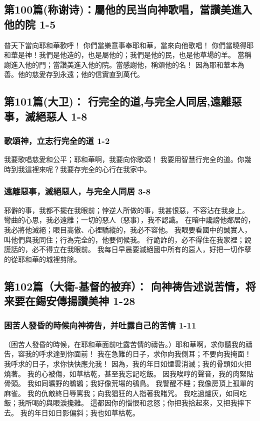 \subsection{第100篇(称谢诗)：屬他的民当向神歌唱，當讚美進入他的院 1-5}
普天下當向耶和華歡呼！
你們當樂意事奉耶和華，當來向他歌唱！
你們當曉得耶和華是神！我們是他造的，也是屬他的；我們是他的民，也是他草場的羊。
當稱謝進入他的門；當讚美進入他的院。當感謝他，稱頌他的名！
因為耶和華本為善。他的慈愛存到永遠；他的信實直到萬代。


\subsection{第101篇(大卫)： 行完全的道,与完全人同居,遠離惡事，滅絕惡人 1-8}
\subsubsection{歌頌神，立志行完全的道 1-2}
我要歌唱慈愛和公平；耶和華啊，我要向你歌頌！
我要用智慧行完全的道。你幾時到我這裡來呢？我要存完全的心行在我家中。
\subsubsection{遠離惡事，滅絕惡人，与完全人同居 3-8}
邪僻的事，我都不擺在我眼前；悖逆人所做的事，我甚恨惡，不容沾在我身上。
彎曲的心思，我必遠離；一切的惡人（惡事），我不認識。
在暗中讒謗他鄰居的，我必將他滅絕；眼目高傲、心裡驕縱的，我必不容他。
我眼要看國中的誠實人，叫他們與我同住；行為完全的，他要伺候我。
行詭詐的，必不得住在我家裡；說謊話的，必不得立在我眼前。
我每日早晨要滅絕國中所有的惡人，好把一切作孽的從耶和華的城裡剪除。


\subsection{第102篇（大衛-基督的被弃）： 向神祷告述说苦情，将来要在錫安傳揚讚美神 1-28}
\subsubsection{困苦人發昏的時候向神祷告，并吐露自己的苦情 1-11}
（困苦人發昏的時候，在耶和華面前吐露苦情的禱告。）耶和華啊，求你聽我的禱告，容我的呼求達到你面前！
我在急難的日子，求你向我側耳；不要向我掩面！我呼求的日子，求你快快應允我！
因為，我的年日如煙雲消滅；我的骨頭如火把燒著。
我的心被傷，如草枯乾，甚至我忘記吃飯。
因我唉哼的聲音，我的肉緊貼骨頭。
我如同曠野的鵜鶘；我好像荒場的鴞鳥。
我警醒不睡；我像房頂上孤單的麻雀。
我的仇敵終日辱罵我；向我猖狂的人指著我賭咒。
我吃過爐灰，如同吃飯；我所喝的與眼淚攙雜。
這都因你的惱恨和忿怒；你把我拾起來，又把我摔下去。
我的年日如日影偏斜；我也如草枯乾。
